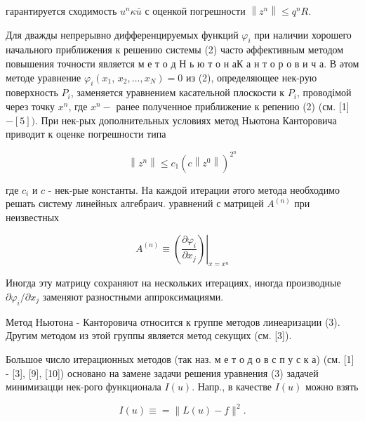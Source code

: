 \documentclass[10pt]{article}
\begin{document}
гарантируется сходимость $u^{n} \kappa \bar{u}$ с оценкой погрешности $\left\|z^{n}\right\| \leqslant q^{n} R$.



Для дважды непрерывно дифференцируемых функций $\varphi_{i}$ при наличии хорошего начального приближения к решению системы (2) часто әффективным методом повышения точности является м е т о д Н ь ю т о н аК а н т о р о в и ч а. В әтом методе уравнение $\varphi_{i}\left(x_{1}\right.$, $\left.x_{2}, \ldots, x_{N}\right)=0$ из (2), определяющее нек-рую поверхность $P_{i}$, заменяется уравнением касательной плоскости к $P_{i}$, проводімой через точку $x^{n}$, где $x^{n}-$ ранее полученное приближение к репению (2) (см. [1] $-[5])$. При нек-рых дополнительных условиях метод Ньютона Канторовича приводит к оценке погрешности типа



\[

\left\|z^{n}\right\| \leqslant c_{1}\left(c\left\|z^{0}\right\|\right)^{2^{n}}

\]



где $c_{i}$ и $c$ - нек-рые константы. На каждой итерации әтого метода необходимо решать систему линейных алгебраич. уравнений с матрицей $A^{(n)}$ при неизвестных



\[

\left.A^{(n)} \equiv\left(\frac{\partial \varphi_{i}}{\partial x_{j}}\right)\right|_{x=x^{n}}

\]



Иногда эту матрицу сохраняют на нескольких итерациях, иногда производные $\partial \varphi_{i} / \partial x_{j}$ заменяют разностными аппроксимациями.



Метод Ньютона - Канторовича относится к группе методов линеаризации (3). Другим методом из этой группы является метод секущих (см. [3]).



Большое число итерационных методов (так наз. м е т о д о в с п у с к а) (см. [1] - [3], [9], [10]) основано на замене задачи решения уравнения (3) задачей минимизацци нек-рого функционала $I(u)$. Напр., в качестве $I(u)$ можно взять



\[

I(u) \equiv=\|L(u)-f\|^{2} .

\]
\end{document}
